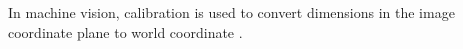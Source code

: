 \documentclass{article}
\begin{document}
	
	In machine vision, calibration is used to convert dimensions in the image coordinate plane to world coordinate \cite{moru2020machine}.
	
	\newpage
	
	
	 
\end{document}
